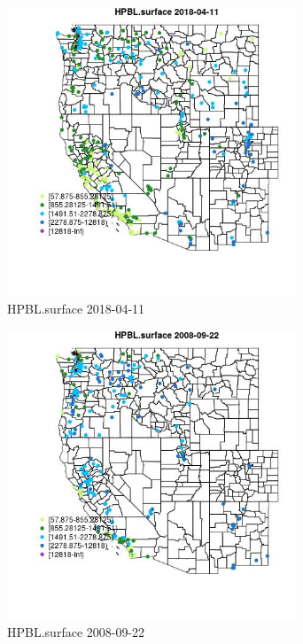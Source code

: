 \begin{figure} 
\centering  
\includegraphics[width=0.77\textwidth]{Code_Outputs/Report_ML_input_PM25_Step4_part_e_de_duplicated_aves_compiled_2019-05-18wNAs_MapObsHPBLsurface2018-04-11.jpg} 
\caption{\label{fig:Report_ML_input_PM25_Step4_part_e_de_duplicated_aves_compiled_2019-05-18wNAsMapObsHPBLsurface2018-04-11}HPBL.surface 2018-04-11} 
\end{figure} 
 

\clearpage 

\begin{figure} 
\centering  
\includegraphics[width=0.77\textwidth]{Code_Outputs/Report_ML_input_PM25_Step4_part_e_de_duplicated_aves_compiled_2019-05-18wNAs_MapObsHPBLsurface2008-09-22.jpg} 
\caption{\label{fig:Report_ML_input_PM25_Step4_part_e_de_duplicated_aves_compiled_2019-05-18wNAsMapObsHPBLsurface2008-09-22}HPBL.surface 2008-09-22} 
\end{figure} 
 

